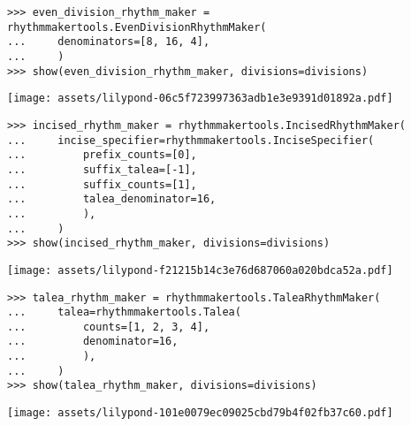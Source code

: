 \begin{singlespacing}
\vspace{-0.5\baselineskip}
\begin{lstlisting}
>>> even_division_rhythm_maker = rhythmmakertools.EvenDivisionRhythmMaker(
...     denominators=[8, 16, 4],
...     )
>>> show(even_division_rhythm_maker, divisions=divisions)
\end{lstlisting}
\texttt{[image: assets/lilypond-06c5f723997363adb1e3e9391d01892a.pdf]}
\end{singlespacing}

\begin{comment}
<abjad>
incised_rhythm_maker = rhythmmakertools.IncisedRhythmMaker(
    incise_specifier=rhythmmakertools.InciseSpecifier(
        prefix_counts=[0],
        suffix_talea=[-1],
        suffix_counts=[1],
        talea_denominator=16,
        ),
    )
show(incised_rhythm_maker, divisions=divisions)
</abjad>
\end{comment}

\begin{singlespacing}
\vspace{-0.5\baselineskip}
\begin{lstlisting}
>>> incised_rhythm_maker = rhythmmakertools.IncisedRhythmMaker(
...     incise_specifier=rhythmmakertools.InciseSpecifier(
...         prefix_counts=[0],
...         suffix_talea=[-1],
...         suffix_counts=[1],
...         talea_denominator=16,
...         ),
...     )
>>> show(incised_rhythm_maker, divisions=divisions)
\end{lstlisting}
\texttt{[image: assets/lilypond-f21215b14c3e76d687060a020bdca52a.pdf]}
\end{singlespacing}

\begin{comment}
<abjad>
talea_rhythm_maker = rhythmmakertools.TaleaRhythmMaker(
    talea=rhythmmakertools.Talea(
        counts=[1, 2, 3, 4],
        denominator=16,
        ),
    )
show(talea_rhythm_maker, divisions=divisions)
</abjad>
\end{comment}

\begin{singlespacing}
\vspace{-0.5\baselineskip}
\begin{lstlisting}
>>> talea_rhythm_maker = rhythmmakertools.TaleaRhythmMaker(
...     talea=rhythmmakertools.Talea(
...         counts=[1, 2, 3, 4],
...         denominator=16,
...         ),
...     )
>>> show(talea_rhythm_maker, divisions=divisions)
\end{lstlisting}
\texttt{[image: assets/lilypond-101e0079ec09025cbd79b4f02fb37c60.pdf]}
\end{singlespacing}

